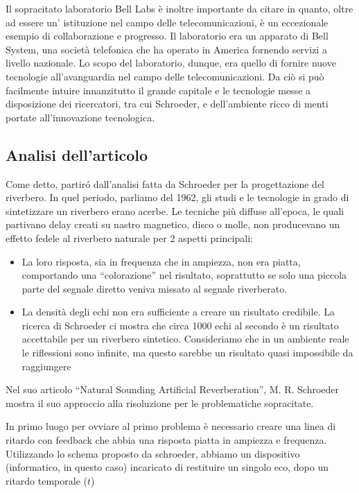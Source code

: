 Il sopracitato laboratorio Bell Labs è inoltre importante da citare in quanto, oltre ad essere un’ istituzione nel campo delle telecomunicazioni, è un eccezionale esempio di collaborazione e progresso. Il laboratorio era un apparato di Bell System, una società telefonica che ha operato in America fornendo servizi a livello nazionale. Lo scopo del laboratorio, dunque, era quello di fornire nuove tecnologie all’avanguardia nel campo delle telecomunicazioni. Da ciò si può facilmente intuire innanzitutto il grande capitale e le tecnologie messe a disposizione dei ricercatori, tra cui Schroeder, e dell’ambiente ricco di menti portate all’innovazione tecnologica.
 
\subsection{Analisi dell'articolo}

Come detto, partiró dall’analisi fatta da Schroeder per la progettazione del riverbero.
In quel periodo, parliamo del 1962, gli studi e le tecnologie in grado di sintetizzare un riverbero erano acerbe.
Le tecniche più diffuse all’epoca, le quali partivano delay creati su nastro magnetico, disco o molle, non producevano un effetto fedele al riverbero naturale per 2 aspetti principali:

\begin{itemize}
\item La loro risposta, sia in frequenza che in ampiezza, non era piatta, comportando una “colorazione” nel risultato, soprattutto se solo una piccola parte del segnale diretto veniva missato al segnale riverberato.
\item La densità degli echi non era sufficiente a creare un risultato credibile. La ricerca di Schroeder ci mostra che circa 1000 echi al secondo è un risultato accettabile per un riverbero sintetico. Consideriamo che in un ambiente reale le riflessioni sono infinite, ma questo sarebbe un risultato quasi impossibile da raggiungere
\end{itemize}

Nel suo articolo “Natural Sounding Artificial Reverberation”, M. R. Schroeder mostra il suo approccio alla risoluzione per le problematiche sopracitate.

In primo luogo per ovviare al primo problema è necessario creare una linea di ritardo con feedback che abbia una risposta piatta in ampiezza e frequenza.
Utilizzando lo schema proposto da schroeder, abbiamo un dispositivo (informatico, in questo caso) incaricato di restituire un singolo eco, dopo un ritardo temporale ($t$)


